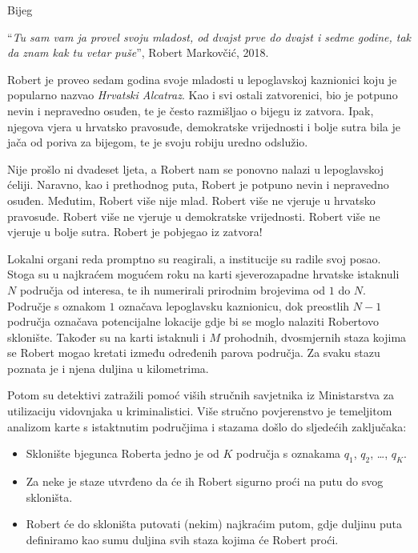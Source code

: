 \begin{statement}[
  problempoints=100,
  timelimit=1 sekunda,
  memorylimit=512 MiB,
]{Bijeg}

``\textit{Tu sam vam ja provel svoju mladost, od dvajst prve do dvajst i sedme
godine, tak da znam kak tu vetar puše}'', Robert Markovčić, 2018.

Robert je proveo sedam godina svoje mladosti u lepoglavskoj kaznionici koju je
popularno nazvao \textit{Hrvatski Alcatraz}. Kao i svi ostali zatvorenici, bio
je potpuno nevin i nepravedno osuđen, te je često razmišljao o bijegu iz zatvora.
Ipak, njegova vjera u hrvatsko pravosuđe, demokratske vrijednosti i bolje sutra
bila je jača od poriva za bijegom, te je svoju robiju uredno odslužio.

Nije prošlo ni dvadeset ljeta, a Robert nam se ponovno nalazi u lepoglavskoj
ćeliji. Naravno, kao i prethodnog puta, Robert je potpuno nevin i nepravedno
osuđen. Međutim, Robert više nije mlad. Robert više ne vjeruje u hrvatsko
pravosuđe.  Robert više ne vjeruje u demokratske vrijednosti. Robert više ne
vjeruje u bolje sutra. Robert je pobjegao iz zatvora!

Lokalni organi reda promptno su reagirali, a institucije su radile svoj posao.
Stoga su u najkraćem mogućem roku na karti sjeverozapadne hrvatske istaknuli
$N$ područja od interesa, te ih numerirali prirodnim brojevima od $1$ do $N$.
Područje s oznakom $1$ označava lepoglavsku kaznionicu, dok preostlih $N-1$
područja označava potencijalne lokacije gdje bi se moglo nalaziti Robertovo
sklonište. Također su na karti istaknuli i $M$ prohodnih, dvosmjernih staza
kojima se Robert mogao kretati između određenih parova područja. Za svaku
stazu poznata je i njena duljina u kilometrima.

Potom su detektivi zatražili pomoć viših stručnih savjetnika iz Ministarstva za
utilizaciju vidovnjaka u kriminalistici. Više stručno povjerenstvo je temeljitom
analizom karte s istaktnutim područjima i stazama došlo do sljedećih zaključaka:

\begin{itemize}
  \item Sklonište bjegunca Roberta jedno je od $K$ područja s oznakama
        $q_1$, $q_2$, \ldots, $q_K$.
  \item Za neke je staze utvrđeno da će ih Robert sigurno proći na putu do svog
        skloništa.
  \item Robert će do skloništa putovati (nekim) najkraćim putom, gdje duljinu
        puta definiramo kao sumu duljina svih staza kojima će Robert proći.
\end{itemize}


\end{statement}
